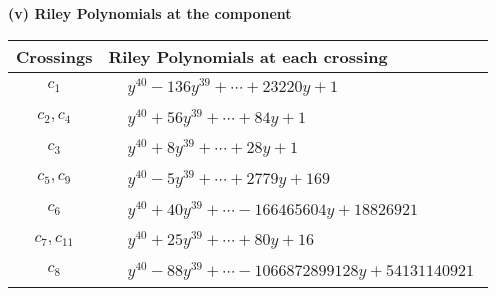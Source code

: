 \documentclass[1p]{elsarticle_modified}
\theoremstyle{definition}
\begin{document}
\newpage\renewcommand{\arraystretch}{1}
\flushleft \textbf{(v) Riley Polynomials at the component}\newline \\
\begin{tabular}{m{50pt}|m{274pt}}
Crossings & \hspace{64pt}Riley Polynomials at each crossing \\
\hline $$\begin{aligned}c_{1}\end{aligned}$$&$\begin{aligned}
&y^{40}-136 y^{39}+\cdots+23220 y+1
\end{aligned}$\\
\hline $$\begin{aligned}c_{2},c_{4}\end{aligned}$$&$\begin{aligned}
&y^{40}+56 y^{39}+\cdots+84 y+1
\end{aligned}$\\
\hline $$\begin{aligned}c_{3}\end{aligned}$$&$\begin{aligned}
&y^{40}+8 y^{39}+\cdots+28 y+1
\end{aligned}$\\
\hline $$\begin{aligned}c_{5},c_{9}\end{aligned}$$&$\begin{aligned}
&y^{40}-5 y^{39}+\cdots+2779 y+169
\end{aligned}$\\
\hline $$\begin{aligned}c_{6}\end{aligned}$$&$\begin{aligned}
&y^{40}+40 y^{39}+\cdots-166465604 y+18826921
\end{aligned}$\\
\hline $$\begin{aligned}c_{7},c_{11}\end{aligned}$$&$\begin{aligned}
&y^{40}+25 y^{39}+\cdots+80 y+16
\end{aligned}$\\
\hline $$\begin{aligned}c_{8}\end{aligned}$$&$\begin{aligned}
&y^{40}-88 y^{39}+\cdots-1066872899128 y+54131140921
\end{aligned}$\\

\end{tabular}
\end{document}
